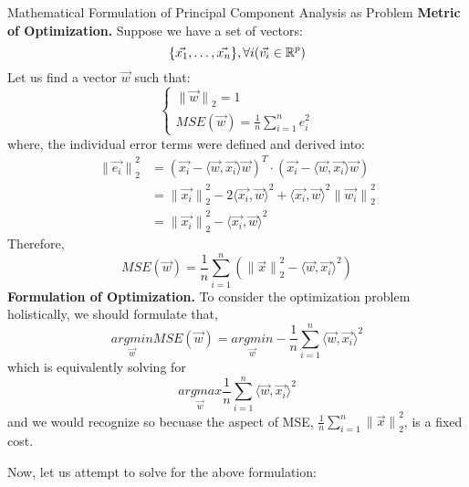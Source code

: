 \begin{ln-explain}{Mathematical Formulation of Principal Component Analysis as Problem}{}
    \textbf{Metric of Optimization.}
    Suppose we have a set of vectors:
    \[
        \{\vec{x_1}, \dots, \vec{x_n}\}, \forall i (\vec{v_i} \in \mathbb{R}^p)
    \]
    Let us find a vector $\vec{w}$ such that:
    \[
        \begin{cases}
            {\lVert \vec{w} \rVert}_2 = 1 \\
            MSE(\vec{w}) = \frac{1}{n} \sum_{i = 1}^n e_i^2
        \end{cases}
    \]
    where, the individual error terms were defined and derived into:
    \begin{align*}
        {\lVert \vec{e_i} \rVert}_2^2
        &= {(\vec{x_i} - \langle \vec{w}, \vec{x_i} \rangle \vec{w})}^T \cdot (\vec{x_i} - \langle \vec{w}, \vec{x_i} \rangle \vec{w}) \\
        &= {\lVert \vec{x_i} \rVert}_2^2 - 2 {\langle \vec{x_i}, \vec{w} \rangle}^2 + {\langle \vec{x_i}, \vec{w} \rangle}^2 {\lVert \vec{w_i} \rVert}_2^2 \\
        &= {\lVert \vec{x_i} \rVert}_2^2 - {\langle \vec{x_i}, \vec{w} \rangle}^2
    \end{align*}
    Therefore,
    \[
        MSE(\vec{w}) = \frac{1}{n} \sum_{i = 1}^n ({\lVert \vec{x} \rVert}_2^2 - {\langle \vec{w}, \vec{x_i} \rangle}^2)
    \]
    \tcblower
    \textbf{Formulation of Optimization.}
    To consider the optimization problem holistically, we should formulate that,
    \[
        \underset{\vec{w}}{argmin} MSE(\vec{w}) = \underset{\vec{w}}{argmin} -\frac{1}{n} \sum_{i = 1}^n {\langle \vec{w}, \vec{x_i} \rangle}^2
    \]
    which is equivalently solving for
    \[
        \underset{\vec{w}}{argmax} \frac{1}{n} \sum_{i = 1}^n {\langle \vec{w}, \vec{x_i} \rangle}^2
    \]
    and we would recognize so becuase the aspect of MSE, $\frac{1}{n} \sum_{i = 1}^n {\lVert \vec{x} \rVert}_2^2$, is a fixed cost.
\end{ln-explain}
Now, let us attempt to solve for the above formulation:
